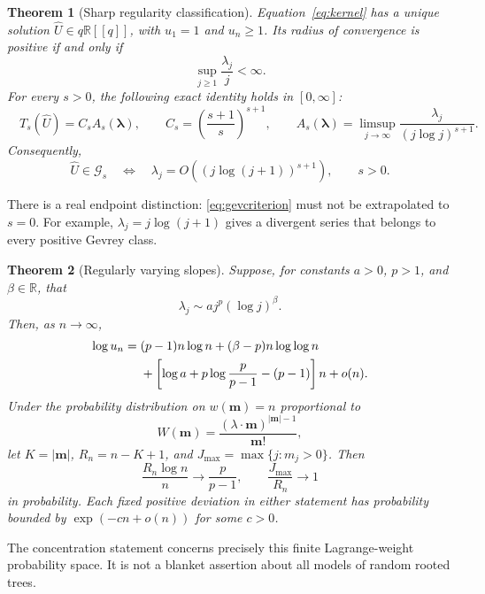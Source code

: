 \documentclass[11pt,a4paper]{article}
\numberwithin{equation}{section}
\newtheorem{theorem}{Theorem}[section]
\theoremstyle{definition}
\theoremstyle{remark}
\newcommand{\R}{\mathbb R}
\newcommand{\Gev}{\mathcal G}
\newcommand{\lam}{\boldsymbol\lambda}
\newcommand{\mm}{\boldsymbol m}
\newcommand{\Uhat}{\widehat U}
\begin{document}
\begin{theorem}[Sharp regularity classification]
\label{thm:classification}
Equation~\eqref{eq:kernel} has a unique solution
$\Uhat\in q\R[[q]]$, with $u_1=1$ and $u_n\ge1$.
Its radius of convergence is positive if and only if
\begin{equation}
 \sup_{j\ge1}\frac{\lambda_j}{j}<\infty.
 \label{eq:analyticcriterion}
\end{equation}
For every $s>0$, the following exact identity holds in $[0,\infty]$:
\begin{equation}
 \boxed{\quad
 T_s(\Uhat)=C_s A_s(\lam),\qquad
 C_s=\left(\frac{s+1}{s}\right)^{s+1},\qquad
 A_s(\lam)=\limsup_{j\to\infty}
  \frac{\lambda_j}{(j\log j)^{s+1}}.
 \quad}
 \label{eq:exacttype}
\end{equation}
Consequently,
\begin{equation}
 \Uhat\in\Gev_s
 \quad\Longleftrightarrow\quad
 \lambda_j=O\!\left((j\log(j+1))^{s+1}\right),
 \qquad s>0.
 \label{eq:gevcriterion}
\end{equation}
\end{theorem}

There is a real endpoint distinction: \eqref{eq:gevcriterion} must not be
extrapolated to $s=0$.  For example, $\lambda_j=j\log(j+1)$ gives a divergent
series that belongs to every positive Gevrey class.

\begin{theorem}[Regularly varying slopes]
\label{thm:regular}
Suppose, for constants $a>0$, $p>1$, and $\beta\in\R$, that
\[
 \lambda_j\sim a j^p(\log j)^\beta.
\]
Then, as $n\to\infty$,
\begin{align}
 \log u_n={}&(p-1)n\log n+(\beta-p)n\log\log n
 \notag\\
 &+\left[\log a+p\log\frac{p}{p-1}-(p-1)\right]n+o(n).
 \label{eq:logasymptotic}
\end{align}
Under the probability distribution on $w(\mm)=n$ proportional to
\[
 W(\mm)=\frac{(\lambda\cdot\mm)^{|\mm|-1}}{\mm!},
\]
let $K=|\mm|$, $R_n=n-K+1$, and
$J_{\max}=\max\{j:m_j>0\}$.  Then
\begin{equation}
 \frac{R_n\log n}{n}\longrightarrow\frac{p}{p-1},
 \qquad
 \frac{J_{\max}}{R_n}\longrightarrow1
 \label{eq:condensationintro}
\end{equation}
in probability.  Each fixed positive deviation in either statement has
probability bounded by $\exp(-c n+o(n))$ for some $c>0$.
\end{theorem}

The concentration statement concerns precisely this finite Lagrange-weight
probability space.  It is not a blanket assertion about all models of
random rooted trees.
\end{document}
